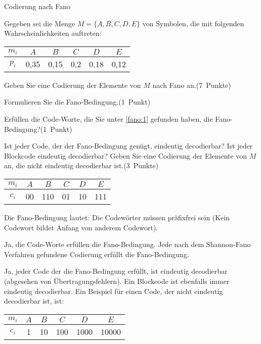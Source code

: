 \documentclass{exercisesheet}
\begin{document}
\begin{eexercises}{Codierung nach Fano}{
    Gegeben sei die Menge $M = \{A, B, C, D, E\}$ von Symbolen, die mit folgenden Wahrscheinlichkeiten auftreten:
    \centering\begin{tabular}{c|ccccc}
      $m_i$ & $A$  & $B$  & $C$ & $D$  & $E$  \\
      \hline
      $p_i$ & 0,35 & 0,15 & 0,2 & 0,18 & 0,12 \\
    \end{tabular}
  }
  \item\label{fano:1} Geben Sie eine Codierung der Elemente von $M$ nach Fano an.\hfill(7~Punkte)
  \item Formulieren Sie die Fano-Bedingung.\hfill(1~Punkt)
  \item Erfüllen die Code-Worte, die Sie unter \ref{fano:1} gefunden haben, die Fano-Bedingung?\hfill(1~Punkt)
  \item Ist jeder Code, der der Fano-Bedingung genügt, eindeutig decodierbar? Ist jeder Blockcode eindeutig decodierbar? Geben Sie eine Codierung der Elemente von $M$ an, die nicht eindeutig decodierbar ist.\hfill(3~Punkte)
\end{eexercises}

\begin{solutions}
  \item
  \begin{tabular}{c|ccccc}
    $m_i$ & $A$ & $B$ & $C$ & $D$ & $E$ \\
    \hline
    $c_i$ & 00  & 110 & 01  & 10  & 111 \\
  \end{tabular}
  \item Die Fano-Bedingung lautet: Die Codewörter müssen präfixfrei sein (Kein Codewort bildet Anfang von anderem Codewort).
  \item Ja, die Code-Worte erfüllen die Fano-Bedingung. Jede nach dem Shannon-Fano Verfahren gefundene Codierung erfüllt die Fano-Bedingung.
  \item Ja, jeder Code der die Fano-Bedingung erfüllt, ist eindeutig decodierbar (abgesehen von Übertragungsfehlern). Ein Blockcode ist ebenfalls immer eindeutig decodierbar. Ein Beispiel für einen Code, der nicht eindeutig decodierbar ist, ist:\par
  \begin{tabular}{c|ccccc}
    $m_i$ & $A$ & $B$ & $C$ & $D$  & $E$   \\
    \hline
    $c_i$ & 1   & 10  & 100 & 1000 & 10000 \\
  \end{tabular}
\end{solutions}
\end{document}
